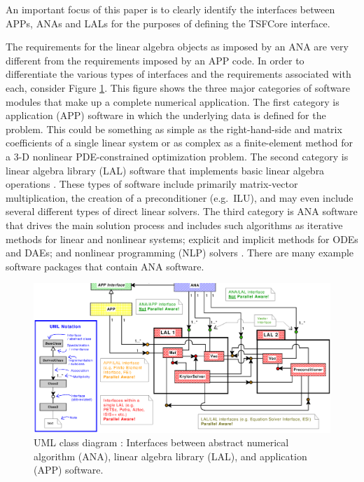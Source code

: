 An important focus of this paper is to clearly identify the interfaces
between APPs, ANAs and LALs for the purposes of defining the TSFCore
interface.

The requirements for the linear algebra objects as imposed by an ANA
are very different from the requirements imposed by an APP code.  In
order to differentiate the various types of interfaces and the
requirements associated with each, consider Figure
{}\ref{tsfcore:fig:ANA_LAL_APP}.  This figure shows the three major
categories of software modules that make up a complete numerical
application.  The first category is application (APP) software in
which the underlying data is defined for the problem.  This could be
something as simple as the right-hand-side and matrix coefficients of
a single linear system or as complex as a finite-element method for a
3-D nonlinear PDE-constrained optimization problem.  The second
category is linear algebra library (LAL) software that implements
basic linear algebra operations {}\cite{ref:demmel_1997,
ref:anderson_1995, ref:blackford_et_al_1997, ref:aztec, ref:petsc,
ref:trilinos}. These types of software include primarily matrix-vector
multiplication, the creation of a preconditioner (e.g.~ILU), and may
even include several different types of direct linear solvers.  The
third category is ANA software that drives the main solution process
and includes such algorithms as iterative methods for linear and
nonlinear systems; explicit and implicit methods for ODEs and DAEs;
and nonlinear programming (NLP) solvers
{}\cite{ref:nocedal_wright_1999}.  There are many example software
packages {}\cite{ref:petsc,ref:aztec,ref:trilinos,ref:pvode,ref:tao}
that contain ANA software.

{\bsinglespace
\begin{figure}[t]
\begin{center}
\includegraphics*[bb= 0.245in 2.95in 10.85in 8.60in,angle=0,scale=0.50
]{analal}
\end{center}
\caption{
\label{tsfcore:fig:ANA_LAL_APP}
UML {}\cite{ref:booch_et_al_1999} class diagram : Interfaces between abstract numerical algorithm
(ANA), linear algebra library (LAL), and application (APP) software.
}
\end{figure}
\esinglespace}

